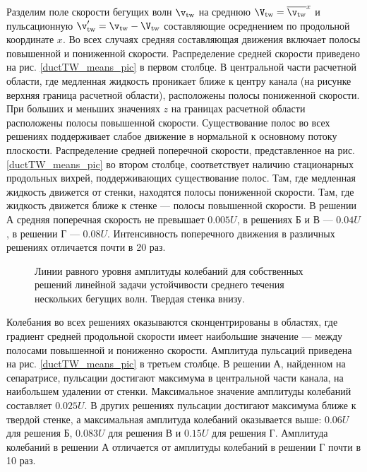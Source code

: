 Разделим поле скорости бегущих волн $\v_\mathrm{tw}$ на среднюю $\V_\mathrm{tw} = \overline{\v_\mathrm{tw}}^x$ и пульсационную $\v'_\mathrm{tw} = \v_\mathrm{tw} - \V_\mathrm{tw}$ составляющие осреднением по продольной координате $x$. Во всех случаях средняя составляющая движения включает полосы повышенной и пониженной скорости. Распределение средней скорости приведено на рис. \ref{ductTW_means_pic} в первом столбце. В центральной части расчетной области, где медленная жидкость проникает ближе к центру канала (на рисунке верхняя граница расчетной области), расположены полосы пониженной скорости. При больших и меньших значениях $z$ на границах расчетной области расположены полосы повышенной скорости. Существование полос во всех решениях поддерживает слабое движение в нормальной к основному потоку плоскости. Распределение средней поперечной скорости, представленное на рис. \ref{ductTW_means_pic} во втором столбце, соответствует наличию стационарных продольных вихрей, поддерживающих существование полос. Там, где медленная жидкость движется от стенки, находятся полосы пониженной скорости. Там, где жидкость движется ближе к стенке --- полосы повышенной скорости. В решении А средняя поперечная скорость не превышает $0.005U$, в решениях Б и В --- $0.04U$, в решении Г --- $0.08U$. Интенсивность поперечного движения в различных решениях отличается почти в 20 раз. 

\begin{figure}
\caption{Линии равного уровня амплитуды колебаний для собственных решений линейной задачи устойчивости среднего течения нескольких бегущих волн. Твердая стенка внизу.} 
\label{ductTW_lin_pic}
\end{figure}

Колебания во всех решениях оказываются сконцентрированы в областях, где градиент средней продольной скорости имеет наибольшие значение --- между полосами повышенной и пониженно скорости. Амплитуда пульсаций приведена на рис. \ref{ductTW_means_pic} в третьем столбце. В решении А, найденном на сепаратрисе, пульсации достигают максимума в центральной части канала, на наибольшем удалении от стенки. Максимальное значение амплитуды колебаний составляет $0.025U$. В других решениях пульсации достигают максимума ближе к твердой стенке, а максимальная амплитуда колебаний оказывается выше: $0.06U$ для решения Б, $0.083U$ для решения В и $0.15U$ для решения Г. Амплитуда колебаний в решении А отличается от амплитуды колебаний в решении Г почти в 10 раз. 

